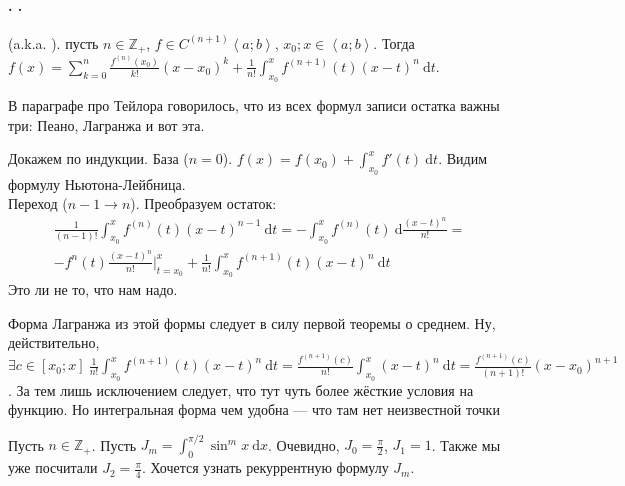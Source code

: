 \documentclass{article}
\newcommand*{\ab}[1][a;b]{{\left\langle #1\right\rangle}}
\begin{document}
    \paragraph{. .}
    \begin{itemize}
        \thm {} (a.k.a. ). пусть $n\in\mathbb Z_+$, $f\in C^{(n+1)}\ab$, $x_0;x\in\ab$. Тогда $f(x)=\sum\limits_{k=0}^n\frac{f^{(n)}(x_0)}{k!}(x-x_0)^k+\frac1{n!}\int_{x_0}^xf^{(n+1)}(t)(x-t)^n~\mathrm dt$.
        \begin{Comment}
            В параграфе про Тейлора говорилось, что из всех формул записи остатка важны три: Пеано, Лагранжа и вот эта.
        \end{Comment}
        \begin{Proof}
            Докажем по индукции. База ($n=0$). $f(x)=f(x_0)+\int_{x_0}^xf'(t)~\mathrm dt$. Видим формулу Ньютона-Лейбница.\\
            Переход ($n-1\to n$). Преобразуем остаток:
            \[
            \begin{split}
                \frac1{(n-1)!}\int_{x_0}^xf^{(n)}(t)(x-t)^{n-1}~\mathrm dt=-\int_{x_0}^xf^{(n)}(t)~\mathrm d\frac{(x-t)^n}{n!}=\\
                -f^{n}(t)\frac{(x-t)^n}{n!}\bigg|_{t=x_0}^x+\frac1{n!}\int_{x_0}^xf^{(n+1)}(t)(x-t)^n~\mathrm dt
            \end{split}
            \]
            Это ли не то, что нам надо.
        \end{Proof}
        \begin{Comment}
            Форма Лагранжа из этой формы следует в силу первой теоремы о среднем. Ну, действительно, $\exists c\in[x_0;x]~\frac1{n!}\int_{x_0}^xf^{(n+1)}(t)(x-t)^n~\mathrm dt=\frac{f^{(n+1)}(c)}{n!}\int_{x_0}^x(x-t)^n~\mathrm dt=\frac{f^{(n+1)}(c)}{(n+1)!}(x-x_0)^{n+1}$. За тем лишь исключением следует, что тут чуть более жёсткие условия на функцию. Но интегральная форма чем удобна --- что там нет неизвестной точки
        \end{Comment}
        \thm Пусть $n\in\mathbb Z_+$. Пусть $J_m=\int_0^{\pi/2}\sin^mx~\mathrm dx$. Очевидно, $J_0=\frac\pi2$, $J_1=1$. Также мы уже посчитали $J_2=\frac\pi4$. Хочется узнать рекуррентную формулу $J_m$.
        \begin{Proof}
            \[
            \begin{split}

\end{split}\]
\end{Proof}
\end{itemize}
\end{document}
